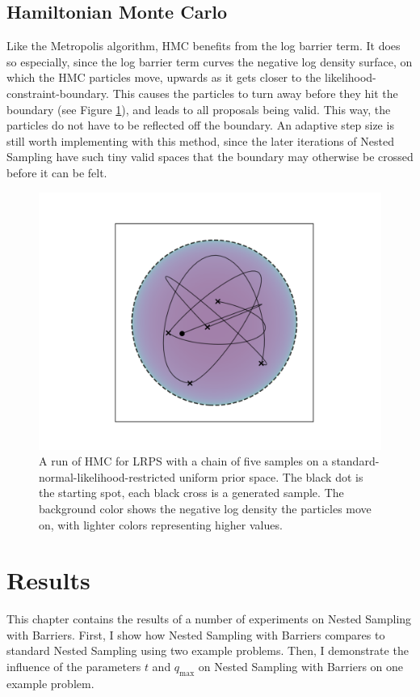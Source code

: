 \documentclass[12pt, a4paper]{report}
\begin{document}
\subsection{Hamiltonian Monte Carlo}
Like the Metropolis algorithm, HMC benefits from the log barrier term.
It does so especially, since the log barrier term curves the negative log density surface, on which the HMC particles move, upwards as it gets closer to the likelihood-constraint-boundary.
This causes the particles to turn away before they hit the boundary (see Figure \ref{fig:barrier_sampling_hmc}), and leads to all proposals being valid.
This way, the particles do not have to be reflected off the boundary.
An adaptive step size is still worth implementing with this method, since the later iterations of Nested Sampling have such tiny valid spaces that the boundary may otherwise be crossed before it can be felt.

\begin{figure}
    \centering
    \includegraphics[scale=0.8]{figs/barrier_sampling_hmc.png}
    \caption{A run of HMC for LRPS with a chain of five samples on a standard-normal-likelihood-restricted uniform prior space.
    The black dot is the starting spot, each black cross is a generated sample.
    The background color shows the negative log density the particles move on, with lighter colors representing higher values.}
    \label{fig:barrier_sampling_hmc}
\end{figure}



\FloatBarrier
\section{Results}
This chapter contains the results of a number of experiments on Nested Sampling with Barriers.
First, I show how Nested Sampling with Barriers compares to standard Nested Sampling using two example problems.
Then, I demonstrate the influence of the parameters $t$ and $q_{\textrm{max}}$ on Nested Sampling with Barriers on one example problem.
\end{document}
